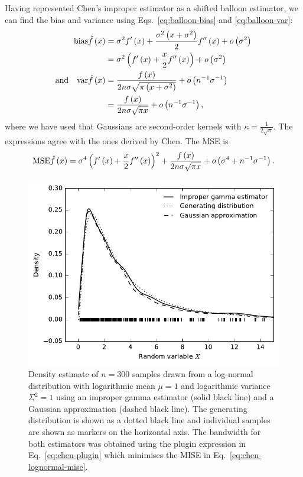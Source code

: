 Having represented Chen's improper estimator as a shifted balloon estimator, we can find the bias and variance using Eqs.~\eqref{eq:balloon-bias} and \eqref{eq:balloon-var}:
\begin{align*}
\mathrm{bias}\hat{f}\left(x\right) & =\sigma^{2}f'\left(x\right)+\frac{\sigma^{2}\left(x+\sigma^{2}\right)}{2}f''\left(x\right)+o\left(\sigma^{2}\right)\\
 & =\sigma^{2}\left(f'\left(x\right)+\frac{x}{2}f''\left(x\right)\right)+o\left(\sigma^{2}\right)\\
\text{and}\quad\mathrm{var}\hat{f}\left(x\right) & =\frac{f\left(x\right)}{2n\sigma\sqrt{\pi\left(x+\sigma^{2}\right)}}+o\left(n^{-1}\sigma^{-1}\right)\\
 & =\frac{f\left(x\right)}{2n\sigma\sqrt{\pi x}}+o\left(n^{-1}\sigma^{-1}\right),
\end{align*}
where we have used that Gaussians are second-order kernels with $\kappa=\frac{1}{2\sqrt{\pi}}$. The expressions agree with the ones derived by Chen. The MSE is
\[
\mathrm{MSE}\hat{f}\left(x\right)=\sigma^{4}\left(f'\left(x\right)+\frac{x}{2}f''\left(x\right)\right)^{2}+\frac{f\left(x\right)}{2n\sigma\sqrt{\pi x}}+o\left(\sigma^{4}+n^{-1}\sigma^{-1}\right).
\]


\begin{figure}
\begin{centering}
\includegraphics{improper-gamma}
\par\end{centering}

\caption{\label{fig:improper-gamma}Density estimate of $n=300$ samples drawn from a log-normal distribution with logarithmic mean $\mu=1$ and logarithmic variance $\Sigma^{2}=1$ using an improper gamma estimator (solid black line) and a Gaussian approximation (dashed black line). The generating distribution is shown as a dotted black line and individual samples are shown as markers on the horizontal axis. The bandwidth for both estimators was obtained using the plugin expression in Eq.~\eqref{eq:chen-plugin} which minimises the MISE in Eq.~\eqref{eq:chen-lognormal-mise}.}
\end{figure}


